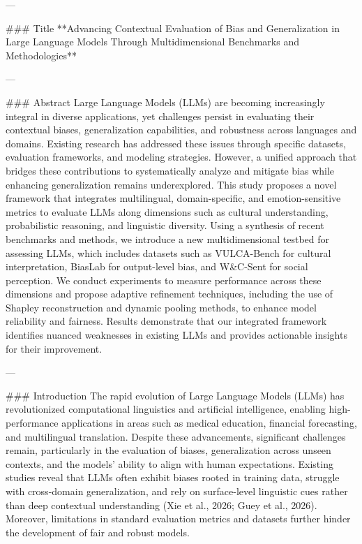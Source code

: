 ---

### Title  
**Advancing Contextual Evaluation of Bias and Generalization in Large Language Models Through Multidimensional Benchmarks and Methodologies**

---

### Abstract  
Large Language Models (LLMs) are becoming increasingly integral in diverse applications, yet challenges persist in evaluating their contextual biases, generalization capabilities, and robustness across languages and domains. Existing research has addressed these issues through specific datasets, evaluation frameworks, and modeling strategies. However, a unified approach that bridges these contributions to systematically analyze and mitigate bias while enhancing generalization remains underexplored. This study proposes a novel framework that integrates multilingual, domain-specific, and emotion-sensitive metrics to evaluate LLMs along dimensions such as cultural understanding, probabilistic reasoning, and linguistic diversity. Using a synthesis of recent benchmarks and methods, we introduce a new multidimensional testbed for assessing LLMs, which includes datasets such as VULCA-Bench for cultural interpretation, BiasLab for output-level bias, and W&C-Sent for social perception. We conduct experiments to measure performance across these dimensions and propose adaptive refinement techniques, including the use of Shapley reconstruction and dynamic pooling methods, to enhance model reliability and fairness. Results demonstrate that our integrated framework identifies nuanced weaknesses in existing LLMs and provides actionable insights for their improvement.

---

### Introduction  
The rapid evolution of Large Language Models (LLMs) has revolutionized computational linguistics and artificial intelligence, enabling high-performance applications in areas such as medical education, financial forecasting, and multilingual translation. Despite these advancements, significant challenges remain, particularly in the evaluation of biases, generalization across unseen contexts, and the models' ability to align with human expectations. Existing studies reveal that LLMs often exhibit biases rooted in training data, struggle with cross-domain generalization, and rely on surface-level linguistic cues rather than deep contextual understanding (Xie et al., 2026; Guey et al., 2026). Moreover, limitations in standard evaluation metrics and datasets further hinder the development of fair and robust models.

